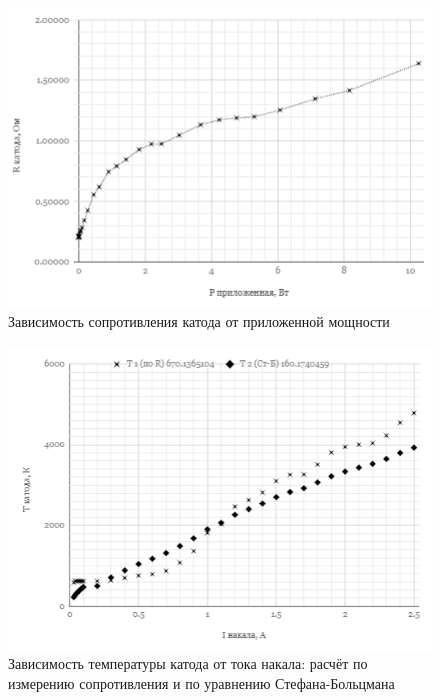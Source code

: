 \documentclass[a4paper]{article}
\begin{document}
\begin{figure}[h]
\begin{center}
\includegraphics[width=13cm]{fig2.PNG}
\caption{Зависимость сопротивления катода от приложенной мощности}
\label{ris:experimoriginal} %
\end{center}
\end{figure}

\begin{figure}[h]
\begin{center}
\includegraphics[width=13cm]{fig3.PNG}
\caption{Зависимость температуры катода от тока накала: расчёт по измерению сопротивления и по уравнению Стефана-Больцмана}
\label{ris:experimoriginal} %
\end{center}
\end{figure}
\end{document}
